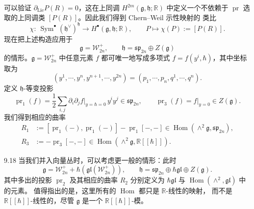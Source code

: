 
可以验证 $\partial_{\mathrm{Lie}}P(R)=0$，这在上同调
$H^{2m}(\mathfrak{g},\mathfrak{h};\mathbb{R})$ 中定义一个不依赖于
$\operatorname{pr}$ 选取的上同调类 $[P(R)]$。因此我们得到 Chern--Weil 示性映射的
类比
\[
  \chi:\ \operatorname{Sym}^\bullet(\mathfrak{h}^\vee)^{\mathfrak{h}}
  \longrightarrow H^\bullet(\mathfrak{g},\mathfrak{h};\mathbb{R}),
  \qquad P\mapsto\chi(P):=[P(R)].
\]
现在把上述构造应用于
\[
  \mathfrak{g}=\mathcal{W}^+_{2n},\qquad
  \mathfrak{h}=\mathfrak{sp}_{2n}\oplus Z(\mathfrak{g})
\]
的情形。$\mathfrak{g}=\mathcal{W}^+_{2n}$ 中任意元素 $f$ 都可唯一地写成多项式
$f=f(y^i,\hbar)$，其中坐标取为
\[
  (y^1,\cdots,y^n,y^{n+1},\cdots,y^{2n})=(p_1,\cdots,p_n,q^1,\cdots,q^n).
\]
定义 $\mathfrak{h}$-等变投影
\[
  \operatorname{pr}_1(f)=\frac{1}{2}\sum_{i,j}
  \partial_i\partial_j f\Big|_{y=\hbar=0}\,y^iy^j\in\mathfrak{sp}_{2n},
  \qquad
  \operatorname{pr}_3(f)=f|_{y=0}\in Z(\mathfrak{g}).
\]
我们得到相应的曲率
\[
  \begin{aligned}
    R_1&:=[\operatorname{pr}_1(-),\operatorname{pr}_1(-)]
    -\operatorname{pr}_1[-,-]\in\operatorname{Hom}(\wedge^2\mathfrak{g},\mathfrak{sp}_{2n}),\\
    R_3&:=-\operatorname{pr}_3[-,-]\in\operatorname{Hom}(\wedge^2\mathfrak{g},\mathbb{R}[[\hbar]]).
  \end{aligned}
\]

\begin{wrem}{9.18}
  当我们并入向量丛时，可以考虑更一般的情形：此时
  \[
    \mathfrak{g}=\mathcal{W}^+_{2n}+\hbar\left(\mathfrak{gl}(\mathcal{W}^+_{2n})\right),
    \qquad
    \mathfrak{h}=\mathfrak{sp}_{2n}\oplus\hbar\mathfrak{gl}\oplus Z(\mathfrak{g}).
  \]
  其中多出的投影 $\operatorname{pr}_2$ 及其相应的曲率 $R_2$ 分别定义为
  $\hbar\mathfrak{gl}$ 与 $\operatorname{Hom}(\wedge^2,\mathfrak{gl})$ 中的元素。
  值得指出的是，这里所有的 $\operatorname{Hom}$ 都只是 $\mathbb{R}$-线性的映射，
  而不是 $\mathbb{R}[[\hbar]]$-线性的，尽管 $\mathfrak{g}$ 是一个
  $\mathbb{R}[[\hbar]]$-模。
\end{wrem}


